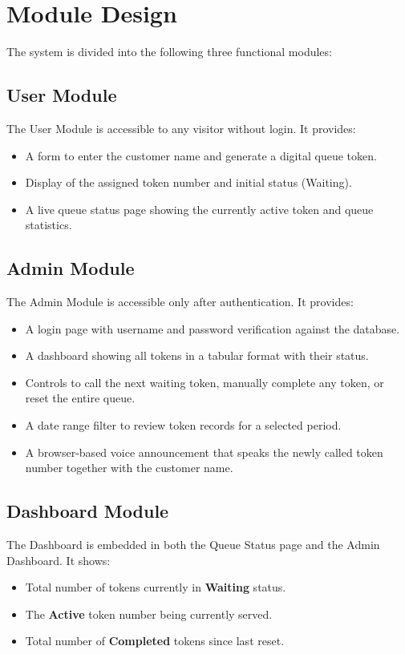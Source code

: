\section{Module Design}

The system is divided into the following three functional modules:

\subsection{User Module}

The User Module is accessible to any visitor without login. It provides:
\begin{itemize}
    \item A form to enter the customer name and generate a digital queue token.
    \item Display of the assigned token number and initial status (Waiting).
    \item A live queue status page showing the currently active token and queue statistics.
\end{itemize}

\subsection{Admin Module}

The Admin Module is accessible only after authentication. It provides:
\begin{itemize}
    \item A login page with username and password verification against the database.
    \item A dashboard showing all tokens in a tabular format with their status.
    \item Controls to call the next waiting token, manually complete any token, or reset the entire queue.
    \item A date range filter to review token records for a selected period.
    \item A browser-based voice announcement that speaks the newly called token number together with the customer name.
\end{itemize}

\subsection{Dashboard Module}

The Dashboard is embedded in both the Queue Status page and the Admin Dashboard. It shows:
\begin{itemize}
    \item Total number of tokens currently in \textbf{Waiting} status.
    \item The \textbf{Active} token number being currently served.
    \item Total number of \textbf{Completed} tokens since last reset.
\end{itemize}

